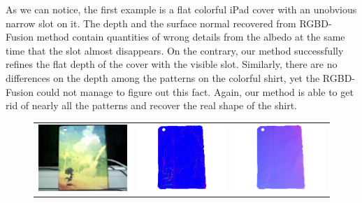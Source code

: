As we can notice, the first example is a flat colorful iPad cover with an unobvious narrow slot on it.
The depth and the surface normal recovered from RGBD-Fusion method contain quantities of wrong details from the albedo at the same time that the slot almost disappears.
On the contrary, our method successfully refines the flat depth of the cover with the visible slot.
Similarly, there are no differences on the depth among the patterns on the colorful shirt, yet the RGBD-Fusion could not manage to figure out this fact.
Again, our method is able to get rid of nearly all the patterns and recover the real shape of the shirt. 

\begin{figure}[!ht]
\centering
\setlength{\tabcolsep}{0.1em} %
 {\renewcommand{\arraystretch}{1.6}%
\begin{tabular}{c|c c}
   \includegraphics[height = 0.24\linewidth]{figures/result/robust_padback_rgb.pdf} 
   &
   \includegraphics[height = 0.24\linewidth]{figures/result/rgbd_padback_normal.pdf} &
   \includegraphics[height = 0.24\linewidth]{figures/result/robust_padback_normal.pdf} \\


\end{tabular}}
\end{figure}
